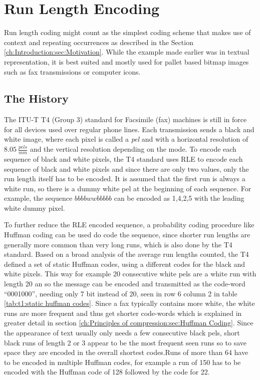\section{Run Length Encoding}
\label{ch:Principles of compression:sec:Run Length Encoding}
\par{
	Run length coding might count as the simplest coding scheme that makes use of context and repeating occurrences as described in the Section \ref{ch:Introduction:sec:Motivation}. While the example made earlier was in textual representation, it is best suited and mostly used for pallet based bitmap images \cite{palette-image} such as fax transmissions or computer icons.
}

\subsection{The History}
\label{ch:Principles of compression:sec:Run Length Encoding:subSec:History}
\par{
 The ITU-T T4 (Group 3) standard for Facsimile (fax) machines \cite{ITU} is still in force for all devices used over regular phone lines. Each transmission sends a black and white image, where each pixel is called a \textit{pel} and with a horizontal resolution of $8.05 \: \frac{pels}{mm}$ and the vertical resolution depending on the mode. To encode each sequence of black and white pixels, the T4 standard uses RLE to encode each sequence of black and white pixels and since there are only two values, only the run length itself has to be encoded. It is assumed that the first run is always a white run, so there is a dummy white pel at the beginning of each sequence. For example, the sequence $bbbbwwbbbbb$ can be encoded as 1,4,2,5 with the leading white dummy pixel.
}
\par{
To further reduce the RLE encoded sequence, a probability coding procedure like Huffman coding can be used do code the sequence, since shorter run lengths are generally more common than very long runs, which is also done by the T4 standard. Based on a broad analysis of the average run lengths counted, the T4 defined a set of static Huffman codes, using a different codes for the black and white pixels. This way for example 20 consecutive white pels  are a white run with length 20 an so the message can be encoded and transmitted as the code-word \enquote{0001000}, needing only 7 bit instead of 20, seen in row 6 column 2 in table \ref{tab:t1:static huffman codes}. Since a fax typically contains more white, the white runs are more frequent and thus get shorter code-words which is explained in greater detail in section \ref{ch:Principles of compression:sec:Huffman Coding}. Since the appearance of text usually only needs a few consecutive black pels, short black runs of length 2 or 3 appear to be the most frequent seen runs so to save space they are encoded in the overall shortest codes.Runs of more than 64 have to be encoded in multiple Huffman codes, for example a run of 150 has to be encoded with the Huffman code of 128 followed by the code for 22.
}
